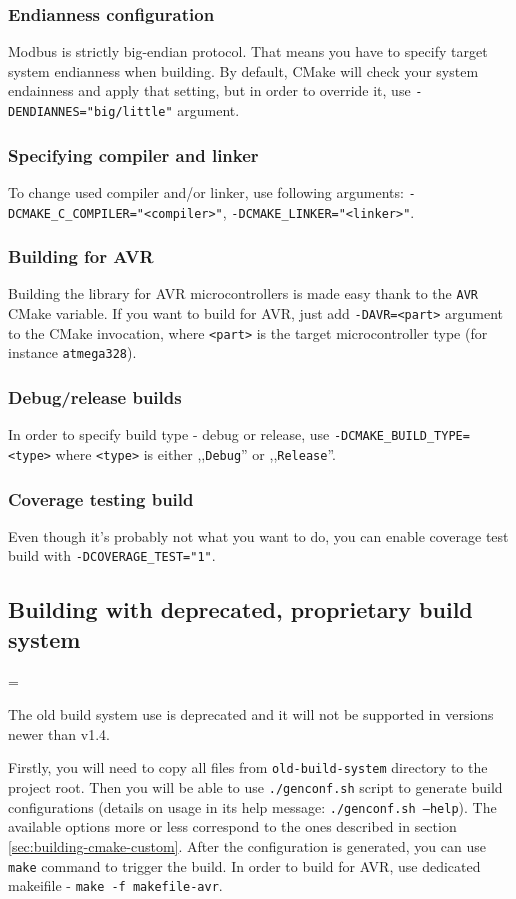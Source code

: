 \documentclass[11pt,a4paper]{article}
\newenvironment{warning}
{
	\par\begin{mdframed}[linewidth=0.5pt,linecolor=black]%
	\begin{list}{}{\leftmargin=1cm
	\labelwidth=\leftmargin}\item[\Large\ding{43}]
}
{	
	\end{list}\end{mdframed}\par
}
\newcommand{\warnbox}[1]{\vspace{0.2cm}\begin{warning}{#1}\end{warning}\vspace{0.2cm}}
\begin{document}
\subsubsection{Endianness configuration}
Modbus is strictly big-endian protocol. That means you have to specify target system endianness when building. By default, CMake will check your system endainness and apply that setting, but in order to override it, use \texttt{-DENDIANNES="big/little"} argument.

\subsubsection{Specifying compiler and linker}
To change used compiler and/or linker, use following arguments: \texttt{-DCMAKE\_C\_COMPILER="<compiler>"}, \texttt{-DCMAKE\_LINKER="<linker>"}.


\subsubsection{Building for AVR}
Building the library for AVR microcontrollers is made easy thank to the \texttt{AVR} CMake variable. 
If you want to build for AVR, just add \texttt{-DAVR=<part>} argument to the CMake invocation, where \texttt{<part>} is the target microcontroller type (for instance \texttt{atmega328}).


\subsubsection{Debug/release builds}
In order to specify build type - debug or release, use \texttt{-DCMAKE\_BUILD\_TYPE=<type>} where \texttt{<type>} is either ,,\texttt{Debug}'' or ,,\texttt{Release}''.

\subsubsection{Coverage testing build}
Even though it's probably not what you want to do, you can enable coverage test build with \texttt{-DCOVERAGE\_TEST="1"}.

\subsection{Building with deprecated, proprietary build system} \label{sec:building-old}
\warnbox{The old build system use is deprecated and it will not be supported in versions newer than v1.4.}

Firstly, you will need to copy all files from \texttt{old-build-system} directory to the project root. Then you will be able to use \texttt{./genconf.sh} script to generate build configurations (details on usage in its help message: \texttt{./genconf.sh --help}). The available options more or less correspond to the ones described in section \ref{sec:building-cmake-custom}. After the configuration is generated, you can use \texttt{make} command to trigger the build. In order to build for AVR, use dedicated makeifile - \texttt{make -f makefile-avr}.
\end{document}

